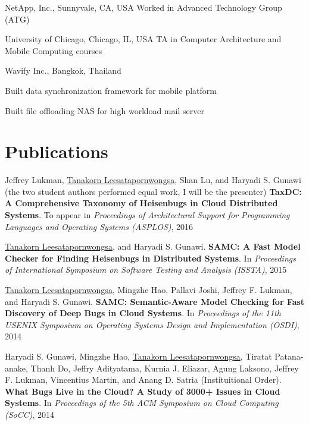\documentclass[10pt]{article} %
\begin{document}
{NetApp, Inc., Sunnyvale, CA, USA}
{Worked in Advanced Technology Group (ATG)} 

{University of Chicago, Chicago, IL, USA}
{TA in Computer Architecture and Mobile Computing courses} 

{Wavify Inc., Bangkok, Thailand}
{\begin{minipage}{\smallertextwidth}
\begin{itemize-noindent}
\setlength\itemsep{-1ex}
\item Built data synchronization framework for mobile platform
\item Built file offloading NAS for high workload mail server
\end{itemize-noindent}
\end{minipage}}


\section{Publications}
Jeffrey Lukman, \underline{Tanakorn Leesatapornwongsa}, Shan Lu, and Haryadi S.
Gunawi (the two student authors performed equal work, I will be the presenter)
\textbf{TaxDC: A Comprehensive Taxonomy of Heisenbugs in Cloud Distributed
Systems}. To appear in \textit{Proceedings of Architectural Support for
Programming Languages and Operating Systems (ASPLOS)}, 2016 
\vspace{2mm}

\underline{Tanakorn Leesatapornwongsa}, and Haryadi S. Gunawi. \textbf{SAMC: A
Fast Model Checker for Finding Heisenbugs in Distributed Systems}. In
\textit{Proceedings of International Symposium on Software Testing and Analysis
(ISSTA)}, 2015
\vspace{2mm}

\underline{Tanakorn Leesatapornwongsa}, Mingzhe Hao, Pallavi Joshi, Jeffrey F.
Lukman, and Haryadi S. Gunawi. \textbf{SAMC: Semantic-Aware Model Checking for
Fast Discovery of Deep Bugs in Cloud Systems}. In \textit{Proceedings of the
11th USENIX Symposium on Operating Systems Design and Implementation (OSDI)},
2014
\vspace{2mm}

Haryadi S. Gunawi, Mingzhe Hao, \underline{Tanakorn Leesatapornwongsa}, Tiratat
Patana-anake, Thanh Do, Jeffry Adityatama, Kurnia J. Eliazar, Agung Laksono,
Jeffrey F. Lukman, Vincentius Martin, and Anang D. Satria (Instituitional Order).
\textbf{What Bugs Live in the Cloud? A Study of 3000+ Issues in Cloud Systems}.
In \textit{Proceedings of the 5th ACM Symposium on Cloud Computing (SoCC)}, 2014
\vspace{2mm}
\end{document}
